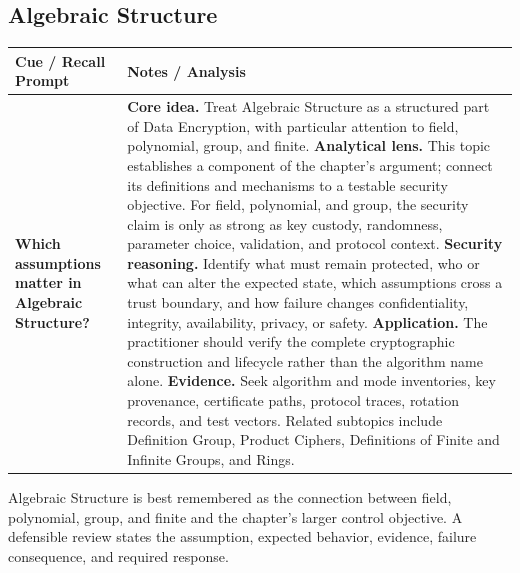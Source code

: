 \documentclass[11pt]{article}
\newcommand{\CornellHeader}{%
\rowcolor{Navy}\color{white}\bfseries Cue / Recall Prompt & \color{white}\bfseries Notes / Analysis\\\hline}
\newcommand{\CornellRow}[2]{%
\cellcolor{CueGray}\RaggedRight\textbf{#1} & \RaggedRight #2\\\hline}
\begin{document}
\subsection*{Algebraic Structure}
\begin{longtable}{>{\RaggedRight\arraybackslash}p{}|>{\RaggedRight\arraybackslash}p{}}
\CornellHeader
\CornellRow{Which assumptions matter in Algebraic Structure?}{\textbf{Core idea.} Treat Algebraic Structure as a structured part of Data Encryption, with particular attention to field, polynomial, group, and finite. \textbf{Analytical lens.} This topic establishes a component of the chapter's argument; connect its definitions and mechanisms to a testable security objective. For field, polynomial, and group, the security claim is only as strong as key custody, randomness, parameter choice, validation, and protocol context. \textbf{Security reasoning.} Identify what must remain protected, who or what can alter the expected state, which assumptions cross a trust boundary, and how failure changes confidentiality, integrity, availability, privacy, or safety. \textbf{Application.} The practitioner should verify the complete cryptographic construction and lifecycle rather than the algorithm name alone. \textbf{Evidence.} Seek algorithm and mode inventories, key provenance, certificate paths, protocol traces, rotation records, and test vectors. Related subtopics include Definition Group, Product Ciphers, Definitions of Finite and Infinite Groups, and Rings.}
\end{longtable}
\begin{topicsummary}
Algebraic Structure is best remembered as the connection between field, polynomial, group, and finite and the chapter's larger control objective. A defensible review states the assumption, expected behavior, evidence, failure consequence, and required response.
\end{topicsummary}
\end{document}
